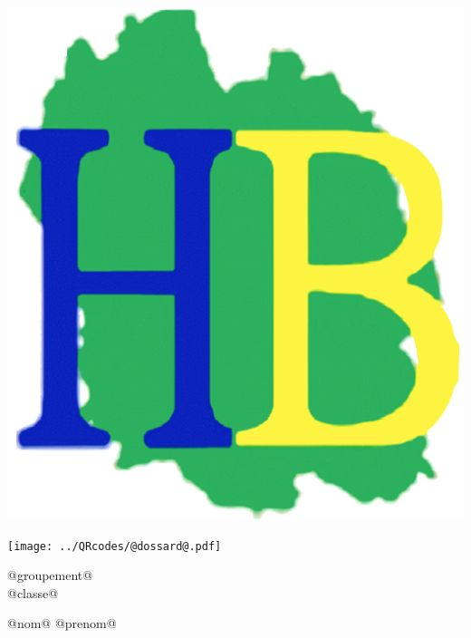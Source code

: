 \Huge

\begin{block} %
{}\hfill {}
{}\hfill {}
\begin{minipage}{0.15\linewidth}
\includegraphics[width=\textwidth]{../logo-HB.png}
\end{minipage}
{}\hfill {}



\begin{minipage}{0.48\linewidth}
\texttt{[image: ../QRcodes/@dossard@.pdf]}
\end{minipage}
\begin{minipage}{0.5\linewidth}
{}\hfill {}
{}\hfill {}
\end{minipage}


\vspace{0.5cm}
\begin{minipage}{0.47\linewidth}
@groupement@ \\
@classe@
\end{minipage}
\hfill {}
\begin{minipage}{0.5\linewidth}
@nom@ @prenom@
\end{minipage}
\hfill {}

\end{block}

\vfill


\vfill
